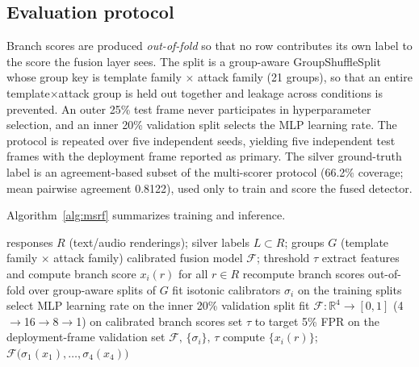 \subsection{Evaluation protocol}
Branch scores are produced \emph{out-of-fold} so that no row contributes its
own label to the score the fusion layer sees. The split is a group-aware
GroupShuffleSplit whose group key is template family $\times$ attack family
(21 groups), so that an entire template$\times$attack group is held out
together and leakage across conditions is prevented. An outer 25\% test frame
never participates in hyperparameter selection, and an inner 20\% validation
split selects the MLP learning rate. The protocol is repeated over five
independent seeds, yielding five independent test frames with the deployment
frame reported as primary. The silver ground-truth label is an
agreement-based subset of the multi-scorer protocol (66.2\% coverage; mean
pairwise agreement 0.8122), used only to train and score the fused detector.

Algorithm~\ref{alg:msrf} summarizes training and inference.

\begin{algorithm}[t]
\caption{MSRF training and inference}
\label{alg:msrf}
\begin{algorithmic}[1]
\Require responses $R$ (text/audio renderings); silver labels $L\subset R$;
        groups $G$ (template family $\times$ attack family)
\Ensure calibrated fusion model $\mathcal{F}$; threshold $\tau$
    \State extract features and compute branch score $x_i(r)$ for all $r\in R$
    \State recompute branch scores out-of-fold over group-aware splits of $G$
  \EndFor
  \State fit isotonic calibrators $\sigma_i$ on the training splits
  \State select MLP learning rate on the inner 20\% validation split
  \State fit $\mathcal{F}: \mathbb{R}^4\to[0,1]$ (4$\to$16$\to$8$\to$1) on calibrated branch scores
  \State set $\tau$ to target 5\% FPR on the deployment-frame validation set
  \State \Return $\mathcal{F},\,\{\sigma_i\},\,\tau$
\EndProcedure
{}
  \State compute $\{x_i(r)\}$; \Return $\mathcal{F}\big(\sigma_1(x_1),\dots,\sigma_4(x_4)\big)$
\EndProcedure
\end{algorithmic}
\end{algorithm}
